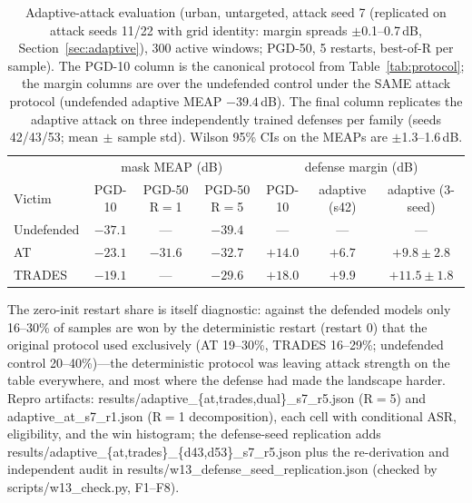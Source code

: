 \documentclass[review]{elsarticle}
\begin{document}
\begin{table}
\centering\small
\caption{Adaptive-attack evaluation (urban, untargeted, attack seed 7
(replicated on attack seeds 11/22 with grid identity: margin spreads
$\pm$0.1--0.7\,dB, Section~\ref{sec:adaptive}),
300 active windows; PGD-50, 5 restarts, best-of-R per sample). The PGD-10
column is the canonical protocol from Table~\ref{tab:protocol}; the margin
columns are over the undefended control under the SAME attack protocol
(undefended adaptive MEAP $-39.4$\,dB). The final column replicates the
adaptive attack on three independently trained defenses per family
(seeds 42/43/53; mean$\,\pm$\,sample std). Wilson 95\% CIs on the MEAPs are
$\pm$1.3--1.6\,dB.}
\label{tab:adaptive}
\begin{tabular}{lccc|ccc}
\toprule
 & \multicolumn{3}{c|}{mask MEAP (dB)} & \multicolumn{3}{c}{defense margin (dB)} \\
Victim & PGD-10 & PGD-50 R$=$1 & PGD-50 R$=$5 & PGD-10 & adaptive (s42) & adaptive (3-seed) \\
\midrule
Undefended & $-37.1$ & --- & $-39.4$ & --- & --- & --- \\
AT & $-23.1$ & $-31.6$ & $-32.7$ & $+14.0$ & $+6.7$ & $+9.8\pm2.8$ \\
TRADES & $-19.1$ & --- & $-29.6$ & $+18.0$ & $+9.9$ & $+11.5\pm1.8$ \\
\bottomrule
\end{tabular}
\end{table}

The zero-init restart share is itself diagnostic: against the defended
models only 16--30\% of samples are won by the deterministic restart
(restart 0) that the original protocol used exclusively (AT 19--30\%,
TRADES 16--29\%; undefended control 20--40\%)---the deterministic
protocol was leaving attack strength on the table everywhere, and most
where the defense had made the landscape harder. Repro artifacts:
results/adaptive\_\{at,trades,dual\}\_s7\_r5.json (R$=$5) and
adaptive\_at\_s7\_r1.json (R$=$1 decomposition), each cell with
conditional ASR, eligibility, and the win histogram; the defense-seed
replication adds results/adaptive\_\{at,trades\}\_\{d43,d53\}\_s7\_r5.json
plus the re-derivation and independent audit in
results/w13\_defense\_seed\_replication.json (checked by
scripts/w13\_check.py, F1--F8).
\end{document}
